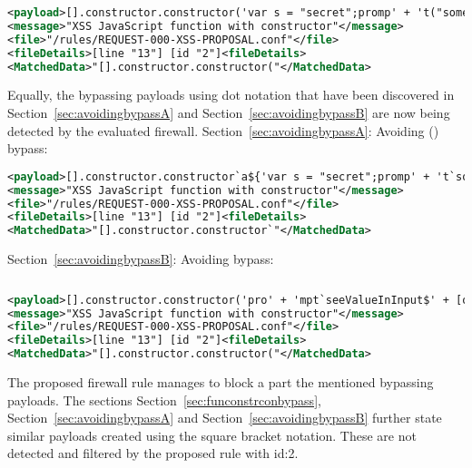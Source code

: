 \begin{lstlisting}[style=ruleStyle, language=XML, caption=function constructor bypass payload using dot notation blocked, label={lst:constructorsblockedpoc}]
<payload>[].constructor.constructor('var s = "secret";promp' + 't("something", s)')()</payload>
<message>"XSS JavaScript function with constructor"</message>
<file>"/rules/REQUEST-000-XSS-PROPOSAL.conf"</file>
<fileDetails>[line "13"] [id "2"]<fileDetails>
<MatchedData>"[].constructor.constructor("</MatchedData>
\end{lstlisting}

Equally, the bypassing payloads using dot notation that have been discovered in Section~\ref{sec:avoidingbypassA} and  Section~\ref{sec:avoidingbypassB} are now being detected by the evaluated firewall. Section~\ref{sec:avoidingbypassA}: Avoiding () bypass:

\begin{lstlisting}[style=ruleStyle, language=XML, caption=avoiding () bypass payload using dot notation blocked, label={lst:constructorsblockedpoc}]
<payload>[].constructor.constructor`a${'var s = "secret";promp' + 't`something\u{0024}{s}`'}```</payload>
<message>"XSS JavaScript function with constructor"</message>
<file>"/rules/REQUEST-000-XSS-PROPOSAL.conf"</file>
<fileDetails>[line "13"] [id "2"]<fileDetails>
<MatchedData>"[].constructor.constructor`"</MatchedData>
\end{lstlisting}

Section~\ref{sec:avoidingbypassB}: Avoiding {} bypass:

\begin{lstlisting}[style=basicStyle, caption=avoiding {} bypass payload using dot notation, label={lst:stringreplacepass}]
\end{lstlisting}
\begin{lstlisting}[style=ruleStyle, language=XML, caption=using constructors rule poc, label={lst:constructorsblockedpoc}]
<payload>[].constructor.constructor('pro' + 'mpt`seeValueInInput$' + [open + []][0][16] + '2+2' + [open + []][0][36] + ':`')();</payload>
<message>"XSS JavaScript function with constructor"</message>
<file>"/rules/REQUEST-000-XSS-PROPOSAL.conf"</file>
<fileDetails>[line "13"] [id "2"]<fileDetails>
<MatchedData>"[].constructor.constructor("</MatchedData>
\end{lstlisting}

The proposed firewall rule manages to block a part the mentioned bypassing payloads. The sections Section~\ref{sec:funconstrconbypass}, Section~\ref{sec:avoidingbypassA} and Section~\ref{sec:avoidingbypassB} further state similar payloads created using the square bracket notation. These are not detected and filtered by the proposed rule with id:2.





